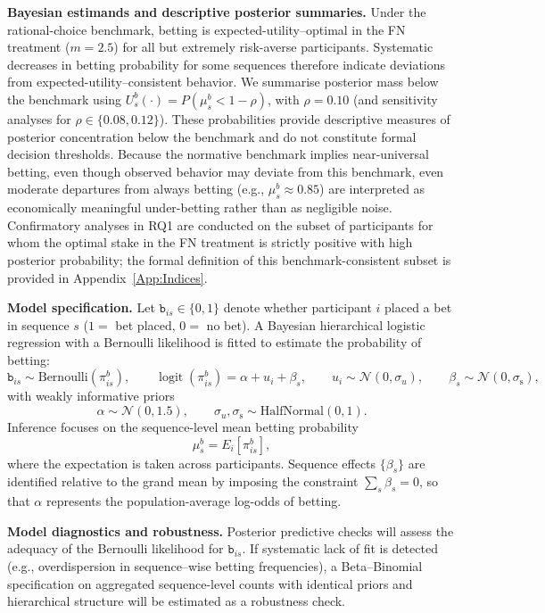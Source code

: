 \documentclass[11pt,a4paper]{article}
\numberwithin{equation}{section}
\begin{document}
\textbf{Bayesian estimands and descriptive posterior summaries.}
Under the rational-choice benchmark, betting is expected-utility--optimal in
the FN treatment ($m = 2.5$) for all but extremely risk-averse participants.
Systematic decreases in betting probability for some sequences therefore
indicate deviations from expected-utility--consistent behavior. We summarise
posterior mass below the benchmark using $U^{b}_s(\cdot) = P(\mu_s^{b} < 1 - \rho)$,
with $\rho = 0.10$ (and sensitivity analyses for $\rho \in \{0.08,0.12\}$). These
probabilities provide descriptive measures of posterior concentration below the
benchmark and do not constitute formal decision thresholds. 
Because the normative benchmark implies near-universal betting, even though observed behavior may deviate from this benchmark, even moderate departures from always betting (e.g., $\mu_s^{b} \approx 0.85$) are interpreted as economically meaningful under-betting rather than as negligible noise.
Confirmatory analyses in RQ1 are conducted on the subset of participants for whom
the optimal stake in the FN treatment is strictly positive with high posterior
probability; the formal definition of this benchmark-consistent subset is
provided in Appendix~\ref{App:Indices}.

\textbf{Model specification.}
Let $\texttt{b}_{is} \in \{0,1\}$ denote whether participant $i$ placed a bet in 
sequence $s$ ($1=$ bet placed, $0=$ no bet). A Bayesian hierarchical logistic 
regression with a Bernoulli likelihood is fitted to estimate the probability of 
betting:
\[
\texttt{b}_{is} \sim \mathrm{Bernoulli}(\pi_{is}^{b}), \qquad
\operatorname{logit}(\pi_{is}^{b}) = \alpha + u_i + \beta_s,
\qquad
u_i \sim \mathcal{N}(0,\sigma_u), \qquad
\beta_s \sim \mathcal{N}(0,\sigma_{\mathrm{s}}),
\]
with weakly informative priors
\[
\alpha \sim \mathcal{N}(0,1.5), \qquad
\sigma_u, \sigma_{\mathrm{s}} \sim \mathrm{HalfNormal}(0,1).
\]
Inference focuses on the sequence-level mean betting probability
\[
\mu_s^{b} = E_i[\pi_{is}^{b}],
\]
where the expectation is taken across participants.
Sequence effects \(\{\beta_s\}\) are identified relative to the grand mean by
imposing the constraint \(\sum_s \beta_s = 0\), so that \(\alpha\) represents the
population-average log-odds of betting.

\textbf{Model diagnostics and robustness.}
Posterior predictive checks will assess the adequacy of the Bernoulli likelihood 
for $\texttt{b}_{is}$. If systematic lack of fit is detected (e.g., overdispersion 
in sequence--wise betting frequencies), a Beta--Binomial specification on 
aggregated sequence-level counts with identical priors and hierarchical structure 
will be estimated as a robustness check.
\end{document}
